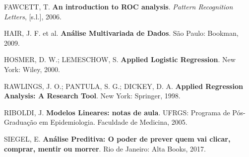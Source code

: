 \documentclass[12pt,brazil,oneside]{book}
\begin{document}
\hypertarget{refs}{}
\leavevmode\hypertarget{ref-Fawcett2006}{}%
FAWCETT, T. \textbf{An introduction to ROC analysis}. \emph{Pattern
Recognition Letters}, {[}s.l.{]}, 2006.

\leavevmode\hypertarget{ref-Hair2009}{}%
HAIR, J. F. et al. \textbf{Análise Multivariada de Dados}. São Paulo:
Bookman, 2009.

\leavevmode\hypertarget{ref-Hosmer2000}{}%
HOSMER, D. W.; LEMESCHOW, S. \textbf{Applied Logistic Regression}. New
York: Wiley, 2000.

\leavevmode\hypertarget{ref-Rawlings1998}{}%
RAWLINGS, J. O.; PANTULA, S. G.; DICKEY, D. A. \textbf{Applied
Regression Analysis: A Research Tool}. New York: Springer, 1998.

\leavevmode\hypertarget{ref-Riboldi2005}{}%
RIBOLDI, J. \textbf{Modelos Lineares: notas de aula}. UFRGS: Programa de
Pós-Graduação em Epidemiologia. Faculdade de Medicina, 2005.

\leavevmode\hypertarget{ref-Siegel2017}{}%
SIEGEL, E. \textbf{Análise Preditiva: O poder de prever quem vai clicar,
comprar, mentir ou morrer}. Rio de Janeiro: Alta Books, 2017.

\leavevmode\hypertarget{ref-Torres-Reyna2014}{}%
\end{document}
